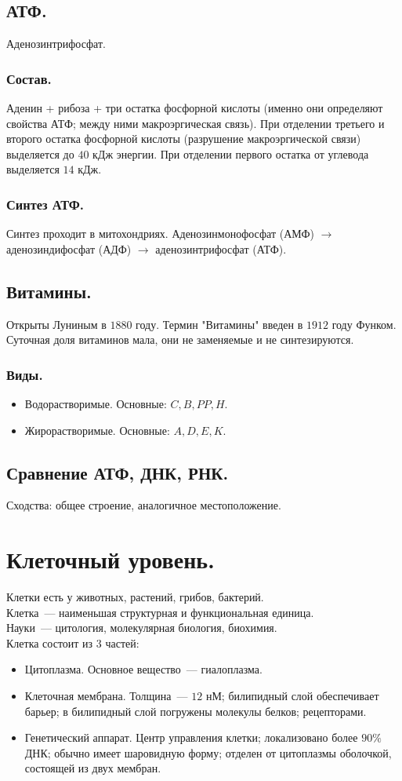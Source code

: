 \documentclass[12pt]{article}
\begin{document}
	\subsection{АТФ.}
	Аденозинтрифосфат.
	\subsubsection{Состав.}
	Аденин + рибоза + три остатка фосфорной кислоты (именно они определяют свойства АТФ; между ними макроэргическая связь). При отделении третьего и второго остатка фосфорной кислоты (разрушение макроэргической связи) выделяется до $40$ кДж энергии. При отделении первого остатка от углевода выделяется $14$ кДж.
	\subsubsection{Синтез АТФ.}
	Синтез проходит в митохондриях. Аденозинмонофосфат (АМФ) $\rightarrow$ аденозиндифосфат (АДФ) $\rightarrow$ аденозинтрифосфат (АТФ).
	\subsection{Витамины.}
	Открыты Луниным в $1880$ году. Термин "Витамины" введен в $1912$ году Функом. \\
	Суточная доля витаминов мала, они не заменяемые и не синтезируются.
	\subsubsection{Виды.}
	\begin{itemize}
		\item Водорастворимые. Основные: $C, B, PP, H$.
		\item Жирорастворимые. Основные: $A, D, E, K$.
	\end{itemize}
	\subsection{Сравнение АТФ, ДНК, РНК.}
	Сходства: общее строение, аналогичное местоположение.
	\section{Клеточный уровень.}
	Клетки есть у животных, растений, грибов, бактерий. \\
	Клетка~--- наименьшая структурная и функциональная единица. \\
	Науки~--- цитология, молекулярная биология, биохимия. \\
	Клетка состоит из $3$ частей:
	\begin{itemize}
		\item Цитоплазма. Основное вещество~--- гиалоплазма.
		\item Клеточная мембрана. Толщина~--- $12$ нМ; билипидный слой обеспечивает барьер; в билипидный слой погружены молекулы белков; рецепторами.
		\item Генетический аппарат. Центр управления клетки; локализовано более $90\%$ ДНК; обычно имеет шаровидную форму; отделен от цитоплазмы оболочкой, состоящей из двух мембран.
	\end{itemize}
\end{document}
